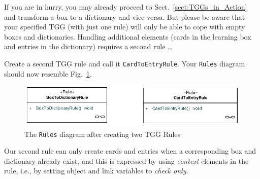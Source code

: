 If you are in hurry, you may already proceed to Sect.~\ref{sect:TGGs_in_Action} and transform a box to a dictionary and vice-versa.
But please be aware that your specified TGG (with just one rule) will only be able to cope with empty boxes and dictionaries. 
Handling additional elements (cards in the learning box and entries in the dictionary) requires a second rule \ldots

Create a second TGG rule and call it \texttt{CardToEntryRule}.
Your \texttt{Rules} diagram should now resemble Fig.~\ref{fig:rules_diagram}.

\begin{figure}[htbp]
\begin{center}
  \includegraphics[width=\textwidth]{pics/tggBilder/tggRule/tgg16}
  \caption{The \texttt{Rules} diagram after creating two TGG Rules}  
  \label{fig:rules_diagram}
\end{center}
\end{figure}

Our second rule can only create cards and entries when a corresponding box and dictionary already exist, and this is expressed by using \emph{context} elements in the rule, i.e., by setting object and link variables to \emph{check only}.

